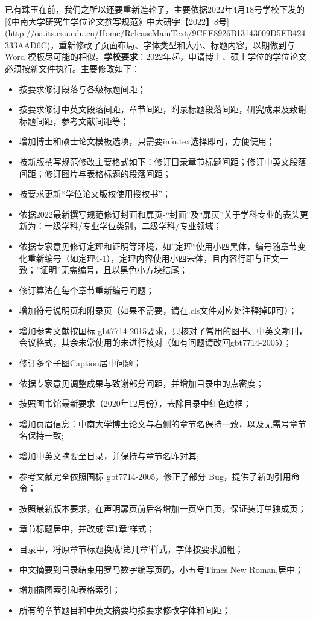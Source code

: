 已有珠玉在前，我们之所以还要重新造轮子，主要依据2022年4月18号学校下发的[《中南大学研究生学位论文撰写规范》中大研字【2022】8号] (http://oa.its.csu.edu.cn/Home/ReleaseMainText/9CFE8926B13143009D5EB424333AAD6C)，重新修改了页面布局、字体类型和大小、标题内容，以期做到与 Word 模板尽可能的相似。\textbf{学校要求}：2022年起，申请博士、硕士学位的学位论文必须按新文件执行。主要修改如下：
\begin{itemize}
\item 按要求修订段落与各级标题间距；
\item 按要求修订中英文段落间距，章节间距，附录标题段落间距，研究成果及致谢标题间距，参考文献间距等；
\item 增加博士和硕士论文模板选项，只需要info.tex选择即可，方便使用；
\item 按新版撰写规范修改主要格式如下：修订目录章节标题间距；修订中英文段落间距；修订图片与表格标题的段落间距；
\item 按要求更新“学位论文版权使用授权书”；
\item 依据2022最新撰写规范修订封面和扉页-“封面”及“扉页”关于学科专业的表头更新为：一级学科/专业学位类别，二级学科/专业领域；
\item 依据专家意见修订定理和证明等环境，如”定理”使用小四黑体，编号随章节变化重新编号（如定理4-1），定理内容使用小四宋体，且内容行距与正文一致；”证明”无需编号，且以黑色小方块结尾；
\item 修订算法在每个章节重新编号问题；
\item 增加符号说明页和附录页（如果不需要，请在.cls文件对应处注释掉即可）；
\item  增加参考文献按国标 gbt7714-2015要求，只核对了常用的图书、中英文期刊，会议格式，其余未常使用的未进行核对（如有问题请改回gbt7714-2005）；
\item  修订多个子图Caption居中问题；
\item 依据专家意见调整成果与致谢部分间距，并增加目录中的点密度；
\item 按照图书馆最新要求（2020年12月份），去除目录中红色边框；
\item 增加页眉信息：中南大学博士论文与右侧的章节名保持一致，以及无需号章节名保持一致;
\item 增加中英文摘要至目录，并保持与章节名昨对其;
\item 参考文献完全依照国标 gbt7714-2005，修正了部分 Bug，提供了新的引用命令；
\item 按照最新版本要求，在声明扉页前后各增加一页空白页，保证装订单独成页；
\item 章节标题居中，并改成‘第1章’样式；
\item 目录中，将原章节标题换成‘第几章’样式，字体按要求加粗；
\item 中文摘要到目录结束用罗马数字编写页码，小五号Times New Roman,居中；
\item 增加插图索引和表格索引；
\item 所有的章节题目和中英文摘要均按要求修改字体和间距；
\end{itemize}


